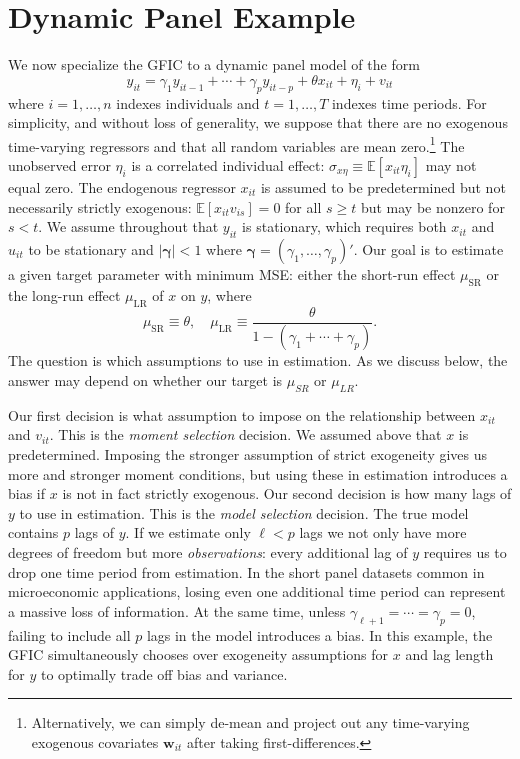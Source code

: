 \section{Dynamic Panel Example}
\label{sec:panel}
We now specialize the GFIC to a dynamic panel model of the form 
\begin{equation}
  y_{it} = \gamma_1 y_{it-1} + \cdots + \gamma_p y_{it-p} + \theta x_{it} + \eta_i + v_{it}
  \label{eq:truepanel}
\end{equation}
where $i = 1, \hdots, n$ indexes individuals and $t=1, \hdots, T$  indexes time periods. 
For simplicity, and without loss of generality, we suppose that there are no exogenous time-varying regressors and that all random variables are mean zero.\footnote{Alternatively, we can simply de-mean and project out any time-varying exogenous covariates $\mathbf{w}_{it}$ after taking first-differences.} 
The unobserved error $\eta_i$ is a correlated individual effect: $\sigma_{x\eta}\equiv \mathbb{E}\left[ x_{it}\eta_i \right]$ may not equal zero. 
The endogenous regressor $x_{it}$ is assumed to be predetermined but not necessarily strictly exogenous: $\mathbb{E}[x_{it} v_{is}]=0$ for all $s \geq t$ but may be nonzero for $s < t$.  
We assume throughout that $y_{it}$ is stationary, which requires both $x_{it}$ and $u_{it}$ to be stationary and $|\boldsymbol{\gamma}| < 1$ where $\boldsymbol{\gamma} = (\gamma_1, \dots, \gamma_p)'$.
Our goal is to estimate a given target parameter with minimum MSE: either the short-run effect $\mu_{\text{SR}}$ or the long-run effect $\mu_{\text{LR}}$ of $x$ on $y$, where 
\begin{equation}
  \mu_{\text{SR}} \equiv \theta, \quad \mu_{\text{LR}} \equiv \frac{\theta}{1- (\gamma_1 + \cdots + \gamma_p)}.
  \label{eq:paneltarget}
\end{equation}
The question is which assumptions to use in estimation.
As we discuss below, the answer may depend on whether our target is $\mu_{SR}$ or $\mu_{LR}$.

Our first decision is what assumption to impose on the relationship between $x_{it}$ and $v_{it}$.
This is the \emph{moment selection} decision.
We assumed above that $x$ is predetermined.
Imposing the stronger assumption of strict exogeneity gives us more and stronger moment conditions, but using these in estimation introduces a bias if $x$ is not in fact strictly exogenous.
Our second decision is how many lags of $y$ to use in estimation.
This is the \emph{model selection} decision.
The true model contains $p$ lags of $y$.
If we estimate only $\ell < p$ lags we not only have more degrees of freedom but more \emph{observations}: every additional lag of $y$ requires us to drop one time period from estimation. 
In the short panel datasets common in microeconomic applications, losing even one additional time period can represent a massive loss of information.
At the same time, unless $\gamma_{\ell+1} = \cdots = \gamma_p = 0$, failing to include all $p$ lags in the model introduces a bias.
In this example, the GFIC simultaneously chooses over exogeneity assumptions for $x$ and lag length for $y$ to optimally trade off bias and variance.

